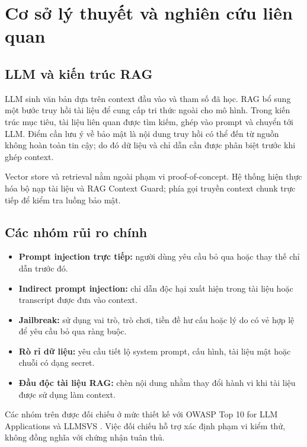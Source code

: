 \chapter{Cơ sở lý thuyết và nghiên cứu liên quan}
\label{chap:background}

\section{LLM và kiến trúc RAG}

LLM sinh văn bản dựa trên context đầu vào và tham số đã học. RAG bổ sung một
bước truy hồi tài liệu để cung cấp tri thức ngoài cho mô hình. Trong kiến trúc
mục tiêu, tài liệu liên quan được tìm kiếm, ghép vào prompt và chuyển tới LLM.
Điểm cần lưu ý về bảo mật là nội dung truy hồi có thể đến từ nguồn không hoàn
toàn tin cậy; do đó dữ liệu và chỉ dẫn cần được phân biệt trước khi ghép context.

Vector store và retrieval nằm ngoài phạm vi proof-of-concept. Hệ thống hiện
thực hóa bộ nạp tài liệu và RAG Context Guard; phía gọi truyền context chunk
trực tiếp để kiểm tra luồng bảo mật.

\section{Các nhóm rủi ro chính}

\begin{itemize}
    \item \textbf{Prompt injection trực tiếp:} người dùng yêu cầu bỏ qua hoặc
    thay thế chỉ dẫn trước đó.
    \item \textbf{Indirect prompt injection:} chỉ dẫn độc hại xuất hiện trong
    tài liệu hoặc transcript được đưa vào context.
    \item \textbf{Jailbreak:} sử dụng vai trò, trò chơi, tiền đề hư cấu hoặc lý
    do có vẻ hợp lệ để yêu cầu bỏ qua ràng buộc.
    \item \textbf{Rò rỉ dữ liệu:} yêu cầu tiết lộ system prompt, cấu hình, tài
    liệu mật hoặc chuỗi có dạng secret.
    \item \textbf{Đầu độc tài liệu RAG:} chèn nội dung nhằm thay đổi hành vi khi
    tài liệu được sử dụng làm context.
\end{itemize}

Các nhóm trên được đối chiếu ở mức thiết kế với OWASP Top 10 for LLM
Applications và LLMSVS \cite{owasp_llm_top10,owasp_llmsvs}. Việc đối chiếu hỗ
trợ xác định phạm vi kiểm thử, không đồng nghĩa với chứng nhận tuân thủ.

